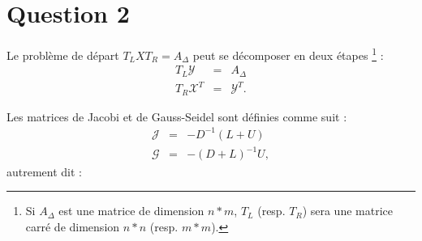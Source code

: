 \section{Question 2}
Le problème de départ $T_L X T_R = A_{\Delta}$ peut se décomposer en deux étapes \footnote{Si $A_{\Delta}$ est une matrice de dimension $n*m$, $T_L$ (resp. $T_R$) sera une  matrice carré de dimension $n*n$ (resp. $m*m$).} : 
\begin{eqnarray}\label{eq_q2}
T_L \mathcal{Y} &=& A_{\Delta}\\
T_R \mathcal{X}^T &=& \mathcal{Y}^T.
\end{eqnarray}

Les matrices de Jacobi et de Gauss-Seidel sont définies comme suit : 
\begin{eqnarray}
\mathcal{J} &=& -D^{-1}(L+U)\\
\mathcal{G} &=& -(D+L)^{-1}U,
\end{eqnarray}
autrement dit :
